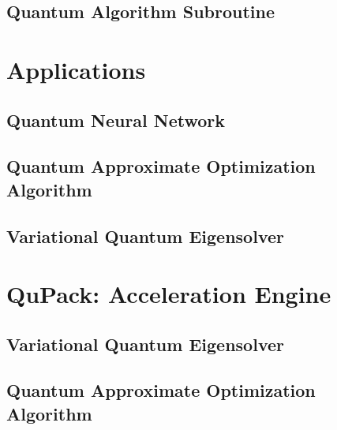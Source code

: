 \documentclass[pra,twocolumn,superscriptaddress,floatfix,nofootinbib,amsmath,amssymb]{revtex4-1}
\numberwithin{equation}{section}
\numberwithin{figure}{section}
\numberwithin{table}{section}
\begin{document}
\subsection{Quantum Algorithm Subroutine}



\section{Applications}
\label{sec:applications}
\subsection{Quantum Neural Network}








\subsection{Quantum Approximate Optimization Algorithm}


\subsection{Variational Quantum Eigensolver}





\section{QuPack: Acceleration Engine}
\label{sec:qupack}


\subsection{Variational Quantum Eigensolver}


\subsection{Quantum Approximate Optimization Algorithm}

\end{document}
